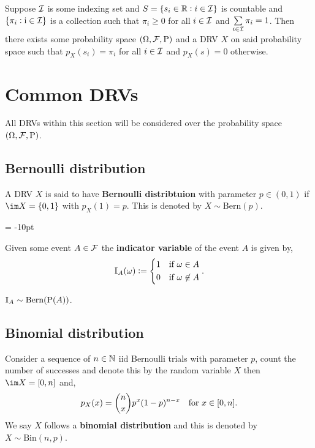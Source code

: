 \documentclass[../Year1/Year1.tex]{subfiles}
\begin{document}
\begin{theorem}
    Suppose $\mathcal{I}$ is some indexing set and $S = \{s_i \in \mathbb{R}: i\in\mathcal{I}\}$ is countable and $\{\pi_i:\mathrm{i} \in \mathcal{I}\}$ is a collection such that $\pi_i \geq 0$ for all $i \in \mathcal{I}$ and $\sum\limits_{i\in\mathcal{I}}\pi_i = 1$. Then there exists some probability space $(\Omega,\mathcal{F},\mathrm{P})$ and a DRV $X$ on said probability space such that $p_X(s_i)=\pi_i$ for all $i\in\mathcal{I}$ and $p_X(s)=0$ otherwise.
\end{theorem}

\section{Common DRVs}
All DRVs within this section will be considered over the probability space $(\Omega, \mathcal{F}, \mathrm{P})$.
\subsection{Bernoulli distribution}
\begin{definition}
    A DRV $X$ is said to have \textbf{Bernoulli distribtuion} with parameter $p\in(0,1)$ if $\im X = \{0,1\}$ with $p_X(1)=p$. This is denoted by $X \sim \text{Bern}(p)$.
\end{definition}

\begingroup\belowdisplayskip = -10pt
\begin{definition}
    Given some event $A\in\mathcal{F}$ the \textbf{indicator variable} of the event $A$ is given by,\[
    \mathbb{I}_A(\omega) := \begin{dcases}
        1 & \text{\textcolor{black}{if }} \omega \in A \\
        0 & \text{\textcolor{black}{if }} \omega \not\in A
    \end{dcases}
    \textcolor{black}{.}
    \]
\end{definition}
\endgroup

\begin{remark}
    $\mathbb{I}_A \sim \text{Bern}(\mathrm{P}(A))$.
\end{remark}

\subsection{Binomial distribution}
\begin{definition}
    Consider a sequence of $n\in\mathbb{N}$ iid Bernoulli trials with parameter $p$, count the number of successes and denote this by the random variable $X$ then $\im X = [0,n]$ and, \[p_X(x) = \binom{n}{x}p^x(1-p)^{n-x} \quad \text{\textcolor{black}{for }$x\in[0,n]$}\textcolor{black}{.}\]
We say $X$ follows a \textbf{binomial distribution} and this is denoted by $X \sim \text{Bin}(n,p)$.
\end{definition}
\end{document}
